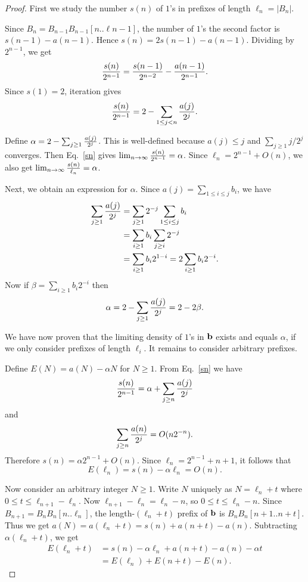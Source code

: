 \documentclass[10pt,a4paper]{amsart}
\begin{document}
\begin{proof}
First we study the number $s(n)$ of $1$'s in prefixes of length
$\ell_n = |B_n|$.

Since $B_n = B_{n-1} B_{n-1}[n..\ell{n-1}]$, the number of $1$'s
the second factor is $s(n-1) - a(n-1)$.
Hence $s(n) = 2s(n-1) - a(n-1)$.  Dividing by $2^{n-1}$, we get
$$ {{s(n)}\over {2^{n-1}}} = {{s(n-1)} \over {2^{n-2}}} - 
{{a(n-1)} \over 2^{n-1}} .$$
Since $s(1) = 2$, iteration gives
\begin{equation}
 {{s(n)} \over {2^{n-1}}} = 2 - \sum_{1 \leq j < n} {{a(j)} \over {2^j}} .
\label{sn}
\end{equation}

Define $\alpha = 2 - \sum_{j \geq 1} {{a(j)} \over {2^j}} $.  This
is well-defined because $a(j) \leq j$ and
$\sum_{j \geq 1} j/2^j$ converges.   Then Eq.~\eqref{sn}
gives $\lim_{n \rightarrow \infty} {{s(n)}\over {2^{n-1}}} = \alpha$.
Since $\ell_n = 2^{n-1} + O(n)$, we also get
$\lim_{n \rightarrow \infty} {{s(n)}\over {\ell_n}} = \alpha$.

Next, we obtain an expression for $\alpha$.
Since $a(j) = \sum_{1 \leq i \leq j} b_i$,
we have
\begin{align*}
\sum_{j \geq 1} {{a(j)} \over {2^j}} &= \sum_{j\geq 1} 2^{-j} \sum_{1 \leq i \leq j} b_i \\
&= \sum_{i \geq 1} b_i \sum_{j \geq i} 2^{-j} \\
&= \sum_{i \geq 1} b_i 2^{1-i}  = 2 \sum_{i \geq 1} b_i 2^{-i}.
\end{align*}
Now if $\beta = \sum_{i \geq 1} b_i 2^{-i}$  then
\begin{equation}
\alpha = 2 - \sum_{j \geq 1} {{a(j)}\over {2^j}} = 2-2 \beta.
\label{alphabeta}
\end{equation}

We have now proven that the limiting density of 
$1$'s in $\bf b$ exists and equals
$\alpha$, if we only consider prefixes of length $\ell_i$.
It remains to consider arbitrary prefixes.

Define $E(N) = a(N) - \alpha N$ for $N \geq 1$.
From Eq.~\eqref{sn} we have
$$ {{s(n)} \over 2^{n-1}} = \alpha + \sum_{j \geq n} {{a(j)} \over
{2^j}} $$
and 
$$ \sum_{j \geq n} {{a(n)} \over {2^j}} = O(n 2^{-n}).$$
Therefore
$s(n) = \alpha 2^{n-1} + O(n)$.
Since $\ell_n = 2^{n-1} + n + 1$, it follows that
$$E(\ell_n) = s(n) - \alpha \ell_n = O(n).$$

Now consider an arbitrary integer $N \geq 1$.  
Write $N$ uniquely as $N = \ell_n + t$ where
$0 \leq t \leq \ell_{n+1} - \ell_n$.
Now
$\ell_{n+1} - \ell_n = \ell_n - n$, so 
$0 \leq t \leq \ell_n - n$.
Since $B_{n+1} = B_n B_n[n..\ell_n]$,
the length-$(\ell_n + t)$ prefix of $\bf b$
is $B_n B_n[n+1..n+t]$.  
Thus we get
$ a(N) = a(\ell_n + t) = s(n) + a(n+t)-a(n)$.
Subtracting $\alpha(\ell_n + t)$, we get
\begin{align}
E(\ell_n + t) &= s(n) - \alpha \ell_n + a(n+t) - a(n) - \alpha t  \nonumber \\
&= E(\ell_n) + E(n+t) - E(n)  \label{ee}.
\end{align}


\end{proof}
\end{document}
